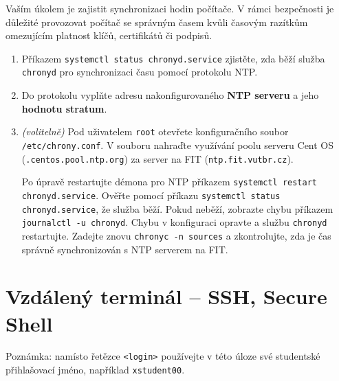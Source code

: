 \documentclass[a4paper,11pt]{article}
\begin{document}
Vaším úkolem je zajistit synchronizaci hodin počítače. V rámci bezpečnosti je
důležité provozovat počítač se správným časem kvůli časovým razítkům
omezujícím platnost klíčů, certifikátů či podpisů.

\begin{enumerate}
  \item Příkazem {\tt systemctl status chronyd.service} zjistěte, zda běží služba
    \texttt{chronyd} pro synchronizaci času pomocí protokolu NTP.

  \item Do protokolu vyplňte adresu nakonfigurovaného \textbf{NTP serveru} a jeho \textbf{hodnotu stratum}.

  \item \textit{(volitelně)} Pod uživatelem \texttt{root} otevřete
    konfiguračního soubor {\tt /etc/chrony.conf}. V souboru
    nahraďte využívání poolu serveru Cent OS ({\tt *.centos.pool.ntp.org}) za
    server na FIT ({\tt ntp.fit.vutbr.cz}).

    Po úpravě restartujte démona pro NTP příkazem {\tt systemctl restart chronyd.service}.
    Ověřte pomocí příkazu {\tt systemctl status chronyd.service}, že služba běží. Pokud
    neběží, zobrazte chybu příkazem {\tt journalctl -u chronyd}. Chybu v konfiguraci opravte a službu {\tt chronyd} restartujte. Zadejte znovu {\tt chronyc -n sources} a zkontrolujte, zda je čas správně synchronizován s NTP serverem na FIT.

\end{enumerate}

\section{Vzdálený terminál -- SSH, Secure Shell}

Poznámka: namísto řetězce {\tt <login>} používejte v této úloze své studentské přihlašovací jméno, například {\tt xstudent00}.
\end{document}
